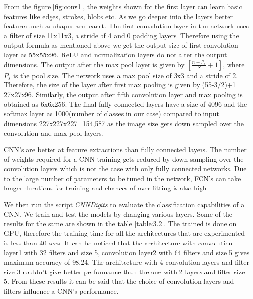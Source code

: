 From the figure \ref{fig:conv1}, the weights shown for the first layer can learn basic features like edges, strokes, blobs etc. As we go deeper into the layers better features such as shapes are learnt. The first convolution layer in the network uses a filter of size 11x11x3, a stride of 4 and 0 padding layers. Therefore using the output formula as mentioned above we get the output size of first convolution layer as  55x55x96. ReLU and normalization layers do not alter the output dimensions. The output after the max pool layer is given by $[\frac{n-P_s}{S}+1]$, where $P_s$ is the pool size. The network uses a max pool size of 3x3 and a stride of 2. Therefore, the size of the layer after first max pooling is given by (55-3/2)+1 = 27x27x96. Similarly, the output after fifth convolution layer and max pooling is obtained as 6x6x256. The final fully connected layers have a size of 4096 and the softmax layer as 1000(number of classes in our case) compared to input dimensions 227x227x227=154,587 as the image size gets  down sampled over the convolution and max pool layers. 

CNN's are better at feature extractions than fully connected layers. The number of weights required for a CNN training gets reduced by down sampling over the convolution layers which is not the case with only fully connected networks. Due to the large number of parameters to be tuned in the network, FCN's can   take longer durations for training and chances of over-fitting is also high.

We then run the script \textit{CNNDigits} to evaluate the classification capabilities of a CNN. We train and test the models by changing various layers. Some of the results for the same are shown in the table \ref{table:3.2}. The trained is done on GPU, therefore the training time for all the architectures that are experimented is less than 40 secs. It can be noticed that the architecture with convolution layer1  with 32 filters and size 5, convolution layer2 with 64 filters and size 5 gives maximum accuracy of 98.24. The architecture with 4 convolution layers and filter size 3 couldn't give better performance than the one with 2 layers and filter size 5. From these results it can be said that the choice of convolution layers and filters influence a CNN's performance.
 

